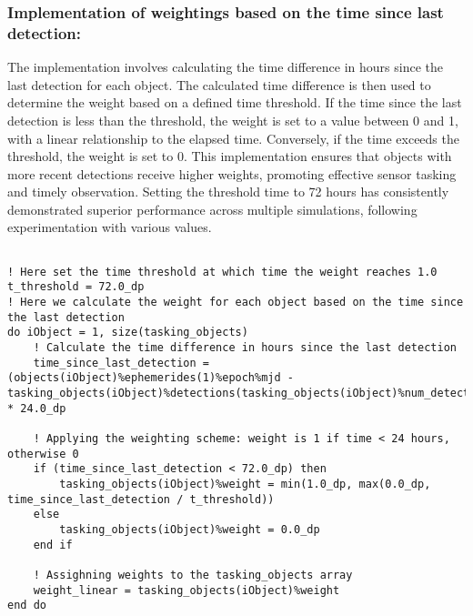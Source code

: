 \subsubsection{Implementation of weightings based on the time since last detection:}
The implementation involves calculating the time difference in hours since the last detection for each object. The calculated time difference is then used to determine the weight based on a defined time threshold. If the time since the last detection is less than the threshold, the weight is set to a value between 0 and 1, with a linear relationship to the elapsed time. Conversely, if the time exceeds the threshold, the weight is set to 0. This implementation ensures that objects with more recent detections receive higher weights, promoting effective sensor tasking and timely observation. Setting the threshold time to 72 hours has consistently demonstrated superior performance across multiple simulations, following experimentation with various values.\\

\begin{lstlisting}

! Here set the time threshold at which time the weight reaches 1.0
t_threshold = 72.0_dp
! Here we calculate the weight for each object based on the time since the last detection
do iObject = 1, size(tasking_objects)
	! Calculate the time difference in hours since the last detection
	time_since_last_detection = (objects(iObject)%ephemerides(1)%epoch%mjd - tasking_objects(iObject)%detections(tasking_objects(iObject)%num_detections)%time%mjd) * 24.0_dp
				
	! Applying the weighting scheme: weight is 1 if time < 24 hours, otherwise 0
	if (time_since_last_detection < 72.0_dp) then
		tasking_objects(iObject)%weight = min(1.0_dp, max(0.0_dp, time_since_last_detection / t_threshold))
	else
		tasking_objects(iObject)%weight = 0.0_dp
	end if

	! Assighning weights to the tasking_objects array
	weight_linear = tasking_objects(iObject)%weight 
end do

\end{lstlisting}




